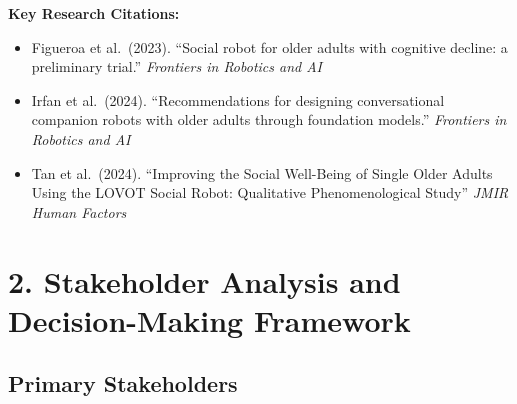 \documentclass[
  letterpaper,
  DIV=11,
  numbers=noendperiod]{scrartcl}
\providecommand{\tightlist}{%
  \setlength{\itemsep}{0pt}\setlength{\parskip}{0pt}}\usepackage{longtable,booktabs,array}
\begin{document}
\textbf{Key Research Citations:}

\begin{itemize}
\tightlist
\item
  Figueroa et al.~(2023). ``Social robot for older adults with cognitive
  decline: a preliminary trial.'' \emph{Frontiers in Robotics and AI}
\item
  Irfan et al.~(2024). ``Recommendations for designing conversational
  companion robots with older adults through foundation models.''
  \emph{Frontiers in Robotics and AI}
\item
  Tan et al.~(2024). ``Improving the Social Well-Being of Single Older
  Adults Using the LOVOT Social Robot: Qualitative Phenomenological
  Study'' \emph{JMIR Human Factors}
\end{itemize}

\section{2. Stakeholder Analysis and Decision-Making
Framework}\label{stakeholder-analysis-and-decision-making-framework}

\subsection{Primary Stakeholders}\label{primary-stakeholders}
\end{document}
